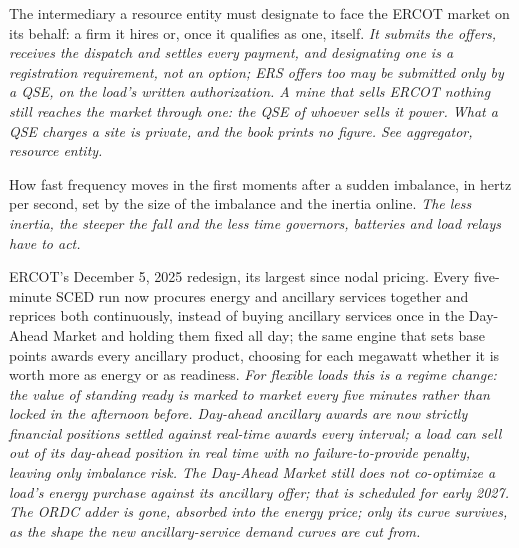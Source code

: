 \begin{description}[leftmargin=0pt,style=unboxed,itemsep=0.35em,parsep=0.15em]
\item[Qualified Scheduling Entity (QSE)] \hypertarget{glossary:qualified-scheduling-entity}{}The intermediary a resource entity must designate to face the ERCOT market on its behalf: a firm it hires or, once it qualifies as one, itself. \emph{It submits the offers, receives the dispatch and settles every payment, and designating one is a registration requirement, not an option; ERS offers too may be submitted only by a QSE, on the load's written authorization. A mine that sells ERCOT nothing still reaches the market through one: the QSE of whoever sells it power. What a QSE charges a site is private, and the book prints no figure. See aggregator, resource entity.}
\item[rate of change of frequency (RoCoF)] \hypertarget{glossary:rate-of-change-of-frequency}{}How fast frequency moves in the first moments after a sudden imbalance, in hertz per second, set by the size of the imbalance and the inertia online. \emph{The less inertia, the steeper the fall and the less time governors, batteries and load relays have to act.}
\item[Real-Time Co-optimization plus Batteries (RTC+B)] \hypertarget{glossary:real-time-co-optimization-plus-batteries}{}ERCOT's December 5, 2025 redesign, its largest since nodal pricing. Every five-minute SCED run now procures energy and ancillary services together and reprices both continuously, instead of buying ancillary services once in the Day-Ahead Market and holding them fixed all day; the same engine that sets base points awards every ancillary product, choosing for each megawatt whether it is worth more as energy or as readiness. \emph{For flexible loads this is a regime change: the value of standing ready is marked to market every five minutes rather than locked in the afternoon before. Day-ahead ancillary awards are now strictly financial positions settled against real-time awards every interval; a load can sell out of its day-ahead position in real time with no failure-to-provide penalty, leaving only imbalance risk. The Day-Ahead Market still does not co-optimize a load's energy purchase against its ancillary offer; that is scheduled for early 2027. The ORDC adder is gone, absorbed into the energy price; only its curve survives, as the shape the new ancillary-service demand curves are cut from.}

\end{description}
